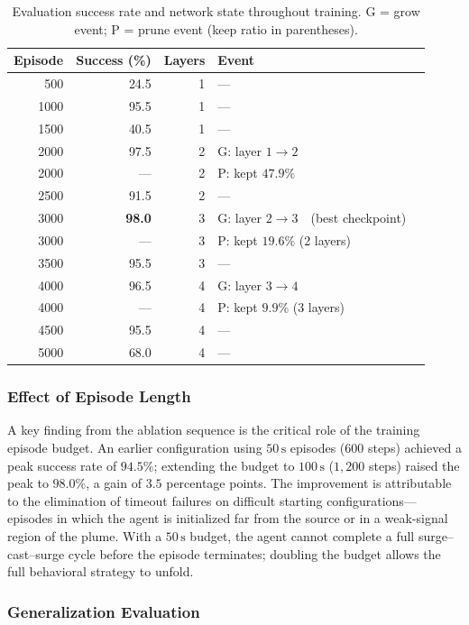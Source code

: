 \begin{table}[h]
\centering
\caption{Evaluation success rate and network state throughout training.
  G = grow event; P = prune event (keep ratio in parentheses).}
\label{tab:gpf_training_curve}
\begin{tabular}{rrrll}
\toprule
\textbf{Episode} & \textbf{Success (\%)} & \textbf{Layers} & \textbf{Event} \\
\midrule
  500 & 24.5 & 1 & --- \\
 1000 & 95.5 & 1 & --- \\
 1500 & 40.5 & 1 & --- \\
 2000 & 97.5 & 2 & G: layer $1 \to 2$ \\
 2000 & ---  & 2 & P: kept $47.9\%$ \\
 2500 & 91.5 & 2 & --- \\
 3000 & \textbf{98.0} & 3 & G: layer $2 \to 3$\ \ (best checkpoint) \\
 3000 & ---  & 3 & P: kept $19.6\%$ (2 layers) \\
 3500 & 95.5 & 3 & --- \\
 4000 & 96.5 & 4 & G: layer $3 \to 4$ \\
 4000 & ---  & 4 & P: kept $9.9\%$ (3 layers) \\
 4500 & 95.5 & 4 & --- \\
 5000 & 68.0 & 4 & --- \\
\bottomrule
\end{tabular}
\end{table}

\subsubsection{Effect of Episode Length}

A key finding from the ablation sequence is the critical role of the
training episode budget.  An earlier configuration using $50\,\text{s}$
episodes ($600$ steps) achieved a peak success rate of $94.5\%$; extending
the budget to $100\,\text{s}$ ($1{,}200$ steps) raised the peak to
$98.0\%$, a gain of $3.5$ percentage points.  The improvement is
attributable to the elimination of timeout failures on difficult starting
configurations—episodes in which the agent is initialized far from the
source or in a weak-signal region of the plume.  With a $50\,\text{s}$
budget, the agent cannot complete a full surge--cast--surge cycle before
the episode terminates; doubling the budget allows the full behavioral
strategy to unfold.

\subsubsection{Generalization Evaluation}

